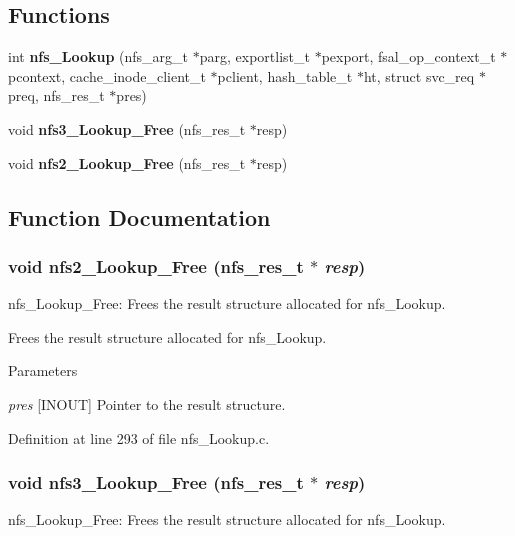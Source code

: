 \subsection*{Functions}
\begin{DoxyCompactItemize}
\item 
int {\bf nfs\_\-Lookup} (nfs\_\-arg\_\-t $\ast$parg, exportlist\_\-t $\ast$pexport, fsal\_\-op\_\-context\_\-t $\ast$pcontext, cache\_\-inode\_\-client\_\-t $\ast$pclient, hash\_\-table\_\-t $\ast$ht, struct svc\_\-req $\ast$preq, nfs\_\-res\_\-t $\ast$pres)
\item 
void {\bf nfs3\_\-Lookup\_\-Free} (nfs\_\-res\_\-t $\ast$resp)
\item 
void {\bf nfs2\_\-Lookup\_\-Free} (nfs\_\-res\_\-t $\ast$resp)
\end{DoxyCompactItemize}


\subsection{Function Documentation}
\subsubsection[{nfs2\_\-Lookup\_\-Free}]{\setlength{\rightskip}{0pt plus 5cm}void nfs2\_\-Lookup\_\-Free (nfs\_\-res\_\-t $\ast$ {\em resp})}\label{nfs__Lookup_8c_a9d570d02276892797b1129e4dd639ad9}
nfs\_\-Lookup\_\-Free: Frees the result structure allocated for nfs\_\-Lookup.

Frees the result structure allocated for nfs\_\-Lookup.


\begin{DoxyParams}{Parameters}
\item[{\em pres}][INOUT] Pointer to the result structure. \end{DoxyParams}


Definition at line 293 of file nfs\_\-Lookup.c.
\subsubsection[{nfs3\_\-Lookup\_\-Free}]{\setlength{\rightskip}{0pt plus 5cm}void nfs3\_\-Lookup\_\-Free (nfs\_\-res\_\-t $\ast$ {\em resp})}\label{nfs__Lookup_8c_a2b42d7f9c6a317c5f84c1d962d524b13}
nfs\_\-Lookup\_\-Free: Frees the result structure allocated for nfs\_\-Lookup.

